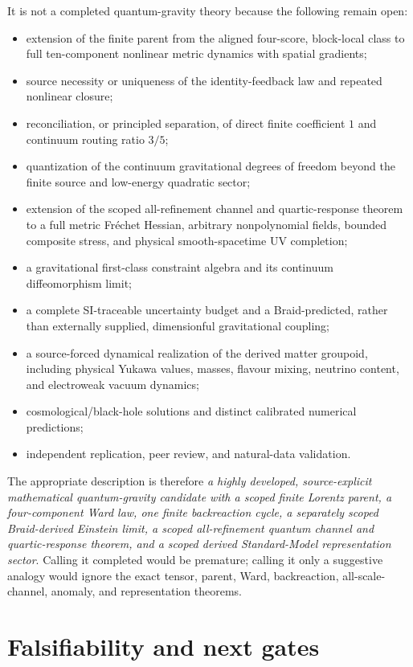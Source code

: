 \documentclass[11pt]{article}
\theoremstyle{definition}
\theoremstyle{remark}
\begin{document}
It is not a completed quantum-gravity theory because the following remain open:
\begin{itemize}
\item extension of the finite parent from the aligned four-score, block-local class to full ten-component nonlinear metric dynamics with spatial gradients;
\item source necessity or uniqueness of the identity-feedback law and repeated nonlinear closure;
\item reconciliation, or principled separation, of direct finite coefficient $1$ and continuum routing ratio $3/5$;
\item quantization of the continuum gravitational degrees of freedom beyond the finite source and low-energy quadratic sector;
\item extension of the scoped all-refinement channel and quartic-response theorem to a full metric Fr\'echet Hessian, arbitrary nonpolynomial fields, bounded composite stress, and physical smooth-spacetime UV completion;
\item a gravitational first-class constraint algebra and its continuum diffeomorphism limit;
\item a complete SI-traceable uncertainty budget and a Braid-predicted, rather than externally supplied, dimensionful gravitational coupling;
\item a source-forced dynamical realization of the derived matter groupoid, including physical Yukawa values, masses, flavour mixing, neutrino content, and electroweak vacuum dynamics;
\item cosmological/black-hole solutions and distinct calibrated numerical predictions;
\item independent replication, peer review, and natural-data validation.
\end{itemize}

The appropriate description is therefore \emph{a highly developed, source-explicit mathematical quantum-gravity candidate with a scoped finite Lorentz parent, a four-component Ward law, one finite backreaction cycle, a separately scoped Braid-derived Einstein limit, a scoped all-refinement quantum channel and quartic-response theorem, and a scoped derived Standard-Model representation sector}. Calling it completed would be premature; calling it only a suggestive analogy would ignore the exact tensor, parent, Ward, backreaction, all-scale-channel, anomaly, and representation theorems.

\section{Falsifiability and next gates}
\end{document}
